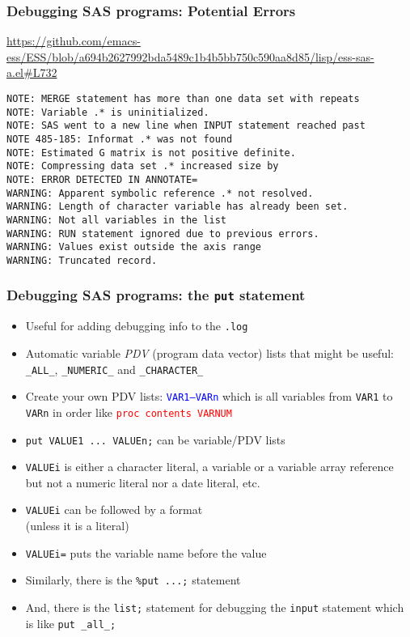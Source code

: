 \documentclass[11pt,pdftex,dvipsnames,usenames,helvetica]{beamer}
\begin{document}
\begin{frame}[fragile]
\frametitle{Debugging SAS programs: Potential Errors}
\url{https://github.com/emacs-ess/ESS/blob/a694b2627992bda5489c1b4b5bb750c590aa8d85/lisp/ess-sas-a.el#L732}
\begin{verbatim}
NOTE: MERGE statement has more than one data set with repeats
NOTE: Variable .* is uninitialized.
NOTE: SAS went to a new line when INPUT statement reached past
NOTE 485-185: Informat .* was not found
NOTE: Estimated G matrix is not positive definite.
NOTE: Compressing data set .* increased size by
NOTE: ERROR DETECTED IN ANNOTATE=
WARNING: Apparent symbolic reference .* not resolved.
WARNING: Length of character variable has already been set.
WARNING: Not all variables in the list 
WARNING: RUN statement ignored due to previous errors.
WARNING: Values exist outside the axis range
WARNING: Truncated record.
\end{verbatim}
\end{frame}

\begin{frame}[fragile]
\frametitle{Debugging SAS programs: the {\tt put} statement}
\begin{itemize}
\item Useful for adding debugging info to the {\tt .log}
\item Automatic variable {\it PDV} (program data vector) 
lists that might be useful:
  {\tt \_ALL\_}, {\tt \_NUMERIC\_} and {\tt \_CHARACTER\_}
\item Create your own PDV lists: \textcolor{blue}{\tt VAR1--VARn}
which is all variables from {\tt VAR1} to {\tt VARn}
in order like \textcolor{red}{\tt proc contents VARNUM}
\item {\tt put VALUE1 ...\ VALUEn;} can be variable/PDV lists
\item {\tt VALUEi} is either a character literal, a variable or a
variable array reference\\
but not a numeric literal nor a date literal, etc.
\item {\tt VALUEi} can be followed by a format\\ 
(unless it is a literal)
\item {\tt VALUEi=} puts the variable name before the value
\item Similarly, there is the {\tt \%put ...;} statement
\item And, there is the {\tt list;} statement
for debugging the {\tt input} statement which 
is like {\tt put \_all\_;}
\end{itemize}

\end{frame}
\end{document}

